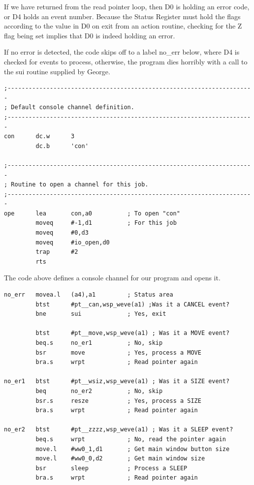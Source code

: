 If we have returned from the read pointer loop, then D0 is holding an error
        code, or D4 holds an event number. Because the Status Register must hold the flags
        according to the value in D0 on exit from an action routine, checking for the Z
        flag being set implies that D0 is indeed holding an error.

If no error is detected, the code skips off to a label no\_err below, where
        D4 is checked for events to process, otherwise, the program dies horribly with a
        call to the sui routine supplied by George.

\begin{lstlisting}[firstnumber=last,caption={Ex0 - Console Channel Details \& Code}]
;----------------------------------------------------------------------
; Default console channel definition.
;----------------------------------------------------------------------
con      dc.w      3
         dc.b      'con'

;----------------------------------------------------------------------
; Routine to open a channel for this job.
;----------------------------------------------------------------------
ope      lea       con,a0          ; To open "con"
         moveq     #-1,d1          ; For this job
         moveq     #0,d3
         moveq     #io_open,d0
         trap      #2
         rts
\end{lstlisting}

The code above defines a console channel for our program and opens
        it.

\begin{lstlisting}[firstnumber=last,caption={Ex0 - Checking Events}]
no_err   movea.l   (a4),a1         ; Status area
         btst      #pt__can,wsp_weve(a1) ;Was it a CANCEL event?
         bne       sui             ; Yes, exit

         btst      #pt__move,wsp_weve(a1) ; Was it a MOVE event?
         beq.s     no_er1          ; No, skip
         bsr       move            ; Yes, process a MOVE
         bra.s     wrpt            ; Read pointer again

no_er1   btst      #pt__wsiz,wsp_weve(a1) ; Was it a SIZE event?
         beq       no_er2          ; No, skip
         bsr.s     resze           ; Yes, process a SIZE
         bra.s     wrpt            ; Read pointer again

no_er2   btst      #pt__zzzz,wsp_weve(a1) ; Was it a SLEEP event?
         beq.s     wrpt            ; No, read the pointer again
         move.l    #ww0_1,d1       ; Get main window button size
         move.l    #ww0_0,d2       ; Get main window size
         bsr       sleep           ; Process a SLEEP
         bra.s     wrpt            ; Read pointer again
\end{lstlisting}

